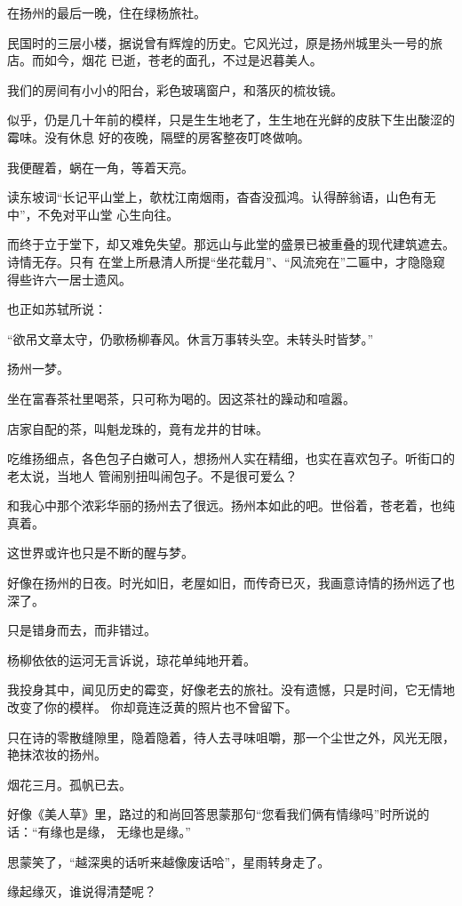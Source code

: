 		在扬州的最后一晚，住在绿杨旅社。

		民国时的三层小楼，据说曾有辉煌的历史。它风光过，原是扬州城里头一号的旅店。而如今，烟花
	已逝，苍老的面孔，不过是迟暮美人。

		我们的房间有小小的阳台，彩色玻璃窗户，和落灰的梳妆镜。

		似乎，仍是几十年前的模样，只是生生地老了，生生地在光鲜的皮肤下生出酸涩的霉味。没有休息
	好的夜晚，隔壁的房客整夜叮咚做响。

		我便醒着，蜗在一角，等着天亮。

		读东坡词“长记平山堂上，欹枕江南烟雨，杳杳没孤鸿。认得醉翁语，山色有无中”，不免对平山堂
	心生向往。

		而终于立于堂下，却又难免失望。那远山与此堂的盛景已被重叠的现代建筑遮去。诗情无存。只有
	在堂上所悬清人所提“坐花载月”、“风流宛在”二匾中，才隐隐窥得些许六一居士遗风。

		也正如苏轼所说：

		“欲吊文章太守，仍歌杨柳春风。休言万事转头空。未转头时皆梦。”

		扬州一梦。

		坐在富春茶社里喝茶，只可称为喝的。因这茶社的躁动和喧嚣。

		店家自配的茶，叫魁龙珠的，竟有龙井的甘味。

		吃维扬细点，各色包子白嫩可人，想扬州人实在精细，也实在喜欢包子。听街口的老太说，当地人
	管闹别扭叫闹包子。不是很可爱么？

		和我心中那个浓彩华丽的扬州去了很远。扬州本如此的吧。世俗着，苍老着，也纯真着。

		这世界或许也只是不断的醒与梦。

		好像在扬州的日夜。时光如旧，老屋如旧，而传奇已灭，我画意诗情的扬州远了也深了。

		只是错身而去，而非错过。

		杨柳依依的运河无言诉说，琼花单纯地开着。

		我投身其中，闻见历史的霉变，好像老去的旅社。没有遗憾，只是时间，它无情地改变了你的模样。
	你却竟连泛黄的照片也不曾留下。

		只在诗的零散缝隙里，隐着隐着，待人去寻味咀嚼，那一个尘世之外，风光无限，艳抹浓妆的扬州。

		烟花三月。孤帆已去。

		好像《美人草》里，路过的和尚回答思蒙那句“您看我们俩有情缘吗”时所说的话：“有缘也是缘，
	无缘也是缘。”

		思蒙笑了，“越深奥的话听来越像废话哈”，星雨转身走了。

		缘起缘灭，谁说得清楚呢？


